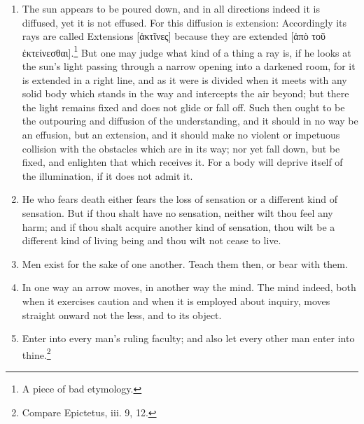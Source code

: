 \begin{enumerate}
\item The sun appears to be poured down, and in all directions indeed it is diffused, yet it is not effused. For this diffusion is extension: Accordingly its rays are called Extensions [{\clarify \textgreek{ἀκτῖνες}}] because they are extended [{\clarify \textgreek{ἀπὸ τοῦ ἐκτείνεσθαι}}].\footnote{A piece of bad etymology.} But one may judge what kind of a thing a ray is, if he looks at the sun's light passing through a narrow opening into a darkened room, for it is extended in a right line, and as it were is divided when it meets with any solid body which stands in the way and intercepts the air beyond; but there the light remains fixed and does not glide or fall off. Such then ought to be the outpouring and diffusion of the understanding, and it should in no way be an effusion, but an extension, and it should make no violent or impetuous collision with the obstacles which are in its way; nor yet fall down, but be fixed, and enlighten that which receives it. For a body will deprive itself of the illumination, if it does not admit it.

\item He who fears death either fears the loss of sensation or a different kind of sensation. But if thou shalt have no sensation, neither wilt thou feel any harm; and if thou shalt acquire another kind of sensation, thou wilt be a different kind of living being and thou wilt not cease to live.

\item Men exist for the sake of one another. Teach them then, or bear with them.

\item In one way an arrow moves, in another way the mind. The mind indeed, both when it exercises caution and when it is employed about inquiry, moves straight onward not the less, and to its object.

\item Enter into every man's ruling faculty; and also let every other man enter into thine.\footnote{Compare Epictetus, iii. 9, 12.}
\end{enumerate}